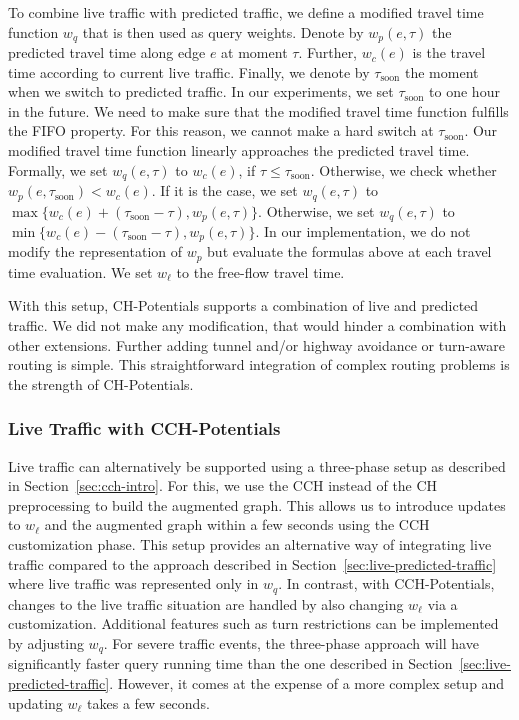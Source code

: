 \documentclass[manuscript,review]{acmart}
\begin{document}
To combine live traffic with predicted traffic, we define a modified travel time function $w_q$ that is then used as query weights.
Denote by $w_p(e,\tau)$ the predicted travel time along edge $e$ at moment $\tau$.
Further, $w_c(e)$ is the travel time according to current live traffic.
Finally, we denote by $\tau_{\mathrm{soon}}$ the moment when we switch to predicted traffic.
In our experiments, we set $\tau_{\mathrm{soon}}$ to one hour in the future.
We need to make sure that the modified travel time function fulfills the FIFO property.
For this reason, we cannot make a hard switch at $\tau_{\mathrm{soon}}$.
Our modified travel time function linearly approaches the predicted travel time. %
%
Formally, we set $w_q(e,\tau)$ to $w_c(e)$, if $\tau \leq \tau_{\mathrm{soon}}$.
Otherwise, we check whether $w_p(e,\tau_{\mathrm{soon}}) < w_c(e)$.
If it is the case, we set $w_q(e,\tau)$ to $\max\{w_c(e)+(\tau_{\mathrm{soon}}-\tau), w_p(e,\tau)\}$.
Otherwise, we set $w_q(e,\tau)$ to $\min\{w_c(e)-(\tau_{\mathrm{soon}}-\tau), w_p(e,\tau)\}$.
In our implementation, we do not modify the representation of $w_p$ but evaluate the formulas above at each travel time evaluation.
We set $w_\ell$ to the free-flow travel time.

With this setup, CH-Potentials supports a combination of live and predicted traffic.
We did not make any modification, that would hinder a combination with other extensions.
Further adding tunnel and/or highway avoidance or turn-aware routing is simple.
This straightforward integration of complex routing problems is the strength of CH-Potentials.

\subsubsection{Live Traffic with CCH-Potentials}

Live traffic can alternatively be supported using a three-phase setup as described in Section~\ref{sec:cch-intro}.
For this, we use the CCH instead of the CH preprocessing to build the augmented graph.
This allows us to introduce updates to $w_\ell$ and the augmented graph within a few seconds using the CCH customization phase.
This setup provides an alternative way of integrating live traffic compared to the approach described in Section~\ref{sec:live-predicted-traffic} where live traffic was represented only in $w_q$.
In contrast, with CCH-Potentials, changes to the live traffic situation are handled by also changing $w_\ell$ via a customization.
Additional features such as turn restrictions can be implemented by adjusting $w_q$.
For severe traffic events, the three-phase approach will have significantly faster query running time than the one described in Section~\ref{sec:live-predicted-traffic}.
However, it comes at the expense of a more complex setup and updating $w_\ell$ takes a few seconds.
\end{document}
